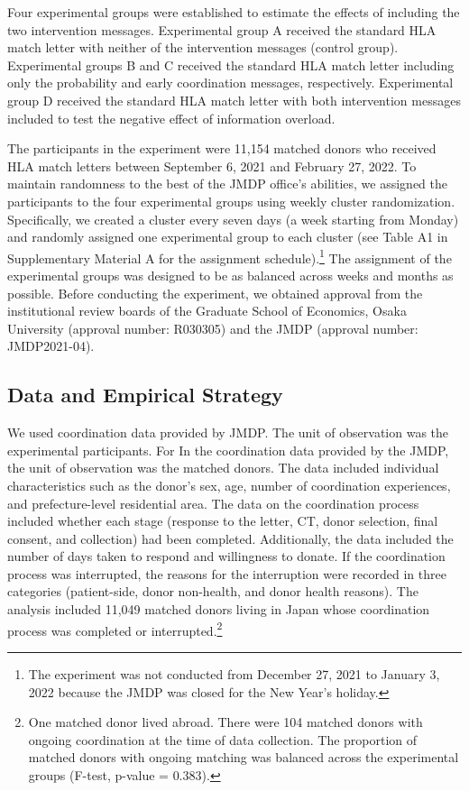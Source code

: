 \documentclass[12pt, a4paper]{article}
\begin{document}
Four experimental groups were established to estimate the effects of including the two intervention messages. Experimental group A received the standard HLA match letter with neither of the intervention messages (control group). Experimental groups B and C received the standard HLA match letter including only the probability and early coordination messages, respectively. Experimental group D received the standard HLA match letter with both intervention messages included to test the negative effect of information overload.

The participants in the experiment were 11,154 matched donors who received HLA match letters between September 6, 2021 and February 27, 2022. To maintain randomness to the best of the JMDP office's abilities, we assigned the participants to the four experimental groups using weekly cluster randomization. Specifically, we created a cluster every seven days (a week starting from Monday) and randomly assigned one experimental group to each cluster (see Table A1 in Supplementary Material A for the assignment schedule).\footnote{The experiment was not conducted from December 27, 2021 to January 3, 2022 because the JMDP was closed for the New Year's holiday.} The assignment of the experimental groups was designed to be as balanced across weeks and months as possible. Before conducting the experiment, we obtained approval from the institutional review boards of the Graduate School of Economics, Osaka University (approval number: R030305) and the JMDP (approval number: JMDP2021-04).

\hypertarget{data-and-empirical-strategy}{%
\subsection{Data and Empirical Strategy}\label{data-and-empirical-strategy}}

We used coordination data provided by JMDP. The unit of observation was the experimental participants. For In the coordination data provided by the JMDP, the unit of observation was the matched donors. The data included individual characteristics such as the donor's sex, age, number of coordination experiences, and prefecture-level residential area. The data on the coordination process included whether each stage (response to the letter, CT, donor selection, final consent, and collection) had been completed. Additionally, the data included the number of days taken to respond and willingness to donate. If the coordination process was interrupted, the reasons for the interruption were recorded in three categories (patient-side, donor non-health, and donor health reasons). The analysis included 11,049 matched donors living in Japan whose coordination process was completed or interrupted.\footnote{One matched donor lived abroad. There were 104 matched donors with ongoing coordination at the time of data collection. The proportion of matched donors with ongoing matching was balanced across the experimental groups (F-test, p-value = \(0.383\)).}
\end{document}

